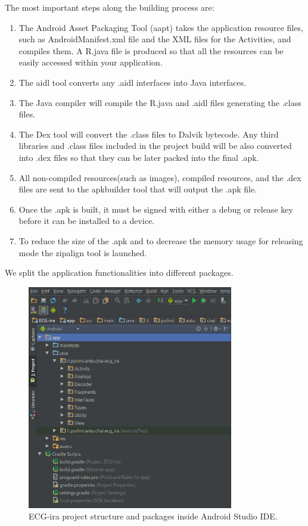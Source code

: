 The most important steps along the building process are:
\begin{enumerate}
	\item The Android Asset Packaging Tool (aapt) takes the application resource files, such as AndroidManifest.xml file and the XML files for the Activities, and compiles them. A R.java  file is produced so that all the resources can be easily accessed within your application.
	\item The aidl tool converts any .aidl interfaces into Java interfaces.
	\item The Java compiler will compile the R.java and .aidl files generating the .class files.
	\item The Dex tool will convert the .class files to Dalvik bytecode. Any third libraries and .class files included in the project build will be also converted into .dex files so that they can be later packed into the final .apk.
	\item All non-compiled resources(such as images), compiled resources, and the .dex files  are sent to the apkbuilder tool that will output the .apk file.
	\item Once the .apk is built, it must be signed with either a debug or release key before it can be installed to a device.
	\item To reduce the size of the .apk and to decrease the memory usage for releasing mode the zipalign tool is launched.
\end{enumerate}
We split the application functionalities into different packages. 
\begin{figure}[ht!]
	\centering
	\includegraphics[width=90mm]{figures/ch8/4.png}
	\caption{ECG-ira project structure and packages inside Android Studio IDE.}
	\label{fig8.4}
\end{figure}
